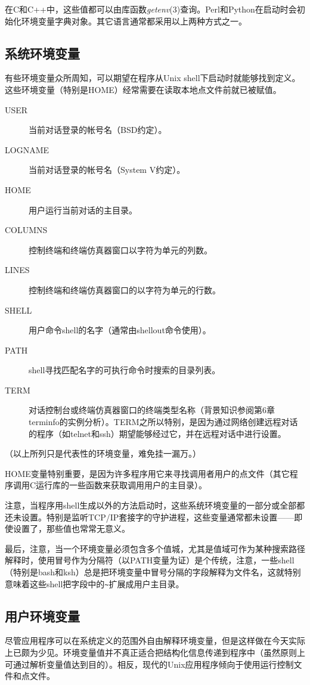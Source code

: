 \documentclass[12pt,oneside]{book}
\begin{document}
\begin{common-format}
在C和C++中，这些值都可以由库函数\textit{getenv}(3)查询。Perl和Python在启动时会初始化环境变量字典对象。其它语言通常都采用以上两种方式之一。

\subsection{系统环境变量}
有些环境变量众所周知，可以期望在程序从Unix shell下启动时就能够找到定义。这些环境变量（特别是HOME）经常需要在读取本地点文件前就已被赋值。
\begin{description}
\item[USER] 当前对话登录的帐号名（BSD约定）。
\item[LOGNAME] 当前对话登录的帐号名（System V约定）。
\item[HOME] 用户运行当前对话的主目录。
\item[COLUMNS] 控制终端和终端仿真器窗口以字符为单元的列数。
\item[LINES] 控制终端和终端仿真器窗口的以字符为单元的行数。
\item[SHELL] 用户命令shell的名字（通常由shellout命令使用）。
\item[PATH] shell寻找匹配名字的可执行命令时搜索的目录列表。
\item[TERM] 对话控制台或终端仿真器窗口的终端类型名称（背景知识参阅第6章terminfo的实例分析）。TERM之所以特别，是因为通过网络创建远程对话的程序（如telnet和ssh）期望能够经过它，并在远程对话中进行设置。
\end{description}    

（以上所列只是代表性的环境变量，难免挂一漏万。）

HOME变量特别重要，是因为许多程序用它来寻找调用者用户的点文件（其它程序调用C运行库的一些函数来获取调用用户的主目录）。

注意，当程序用shell生成以外的方法启动时，这些系统环境变量的一部分或全部都还未设置。特别是监听TCP/IP套接字的守护进程，这些变量通常都未设置——即使设置了，那些值也常常无意义。

最后，注意，当一个环境变量必须包含多个值城，尤其是值域可作为某种搜索路径解释时，使用冒号作为分隔符（以PATH变量为证）是个传统，注意，一些shell（特别是bash和ksh）总是把环境变量中冒号分隔的字段解释为文件名，这就特别意味着这些shell把字段中的\verb+~+扩展成用户主目录。

\subsection{用户环境变量}
尽管应用程序可以在系统定义的范围外自由解释环境变量，但是这样做在今天实际上已颇为少见。环境变量值并不真正适合把结构化信息传递到程序中（虽然原则上可通过解析变量值达到目的）。相反，现代的Unix应用程序倾向于使用运行控制文件和点文件。


\end{common-format}
\end{document}
